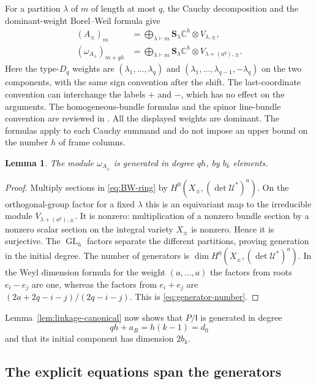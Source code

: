 \documentclass[11pt]{article}
\newtheorem{lemma}[theorem]{Lemma}
\theoremstyle{definition}
\theoremstyle{remark}
\numberwithin{equation}{section}
\DeclareMathOperator{\GL}{GL}
\newcommand{\CC}{\mathbb C}
\newcommand{\UU}{\mathcal U}
\newcommand{\II}{\mathsf I}
\newcommand{\Schur}{\mathbf S}
\begin{document}
For a partition $\lambda$ of $m$ of length at most $q$, the Cauchy
decomposition and the dominant-weight Borel--Weil formula give
\begin{align}
 (A_\pm)_m
 &=\bigoplus_{\lambda\vdash m}\Schur_\lambda\CC^h\otimes V_{\lambda,\pm},
 \label{eq:BW-ring}\\
 (\omega_{A_\pm})_{m+qh}
 &=\bigoplus_{\lambda\vdash m}\Schur_\lambda\CC^h
        \otimes V_{\lambda+(a^q),\pm}.\label{eq:BW-canonical}
\end{align}
Here the type-$D_q$ weights are
$(\lambda_1,\ldots,\lambda_q)$ and
$(\lambda_1,\ldots,\lambda_{q-1},-\lambda_q)$ on the two components,
with the same sign convention after the shift. The last-coordinate
convention can interchange the labels $+$ and $-$, which has no effect
on the arguments. The homogeneous-bundle formulas and the spinor
line-bundle convention are reviewed in \cite[Sections 2.2, 3.3, and 4.1]{SW}.
All the displayed weights are dominant. The formulas apply to each
Cauchy summand and do not impose an upper bound on the number $h$ of
frame columns.

\begin{lemma}\label{lem:canonical-generators}
The module $\omega_{A_\pm}$ is generated in degree $qh$, by $b_k$
elements.
\end{lemma}

\begin{proof}
Multiply sections in \eqref{eq:BW-ring} by
$H^0(X_\pm,(\det\UU^*)^a)$. On the orthogonal-group factor for a
fixed $\lambda$ this is an equivariant map to the irreducible module
$V_{\lambda+(a^q),\pm}$. It is nonzero: multiplication of a nonzero
bundle section by a nonzero scalar section on the integral variety
$X_\pm$ is nonzero. Hence it is surjective. The $\GL_h$ factors
separate the different partitions, proving generation in the initial
degree. The number of generators is
$\dim H^0(X_\pm,(\det\UU^*)^a)$. In the Weyl dimension formula for
the weight $(a,\ldots,a)$ the factors from roots $e_i-e_j$ are one,
whereas the factors from $e_i+e_j$ are
$(2a+2q-i-j)/(2q-i-j)$. This is \eqref{eq:generator-number}.
\end{proof}

Lemma~\ref{lem:linkage-canonical} now shows that $P/\II$ is generated
in degree
\[
 qh+a_R=h(k-1)=d_0
\]
and that its initial component has dimension $2b_k$.

\subsection{The explicit equations span the generators}
\end{document}
